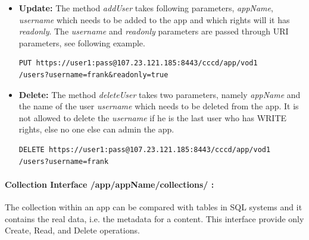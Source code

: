 \begin{itemize}
\item \textbf{Update:} The method \textit{addUser} takes following parameters, \textit{appName}, \textit{username} which needs to be added to the app and which rights will it has \textit{readonly}. The \textit{username} and \textit{readonly} parameters are passed through \ac{URI} parameters, see following example.

\begin{code}
\begin{verbatim}
PUT https://user1:pass@107.23.121.185:8443/cccd/app/vod1
/users?username=frank&readonly=true
\end{verbatim}
\end{code}

\item \textbf{Delete:} The method \textit{deleteUser} takes two parameters, namely \textit{appName} and the name of the user \textit{username} which needs to be deleted from the app. It is not allowed to delete the \textit{username} if he is the last user who has WRITE rights, else no one else can admin the app.

\begin{code}
\begin{verbatim}
DELETE https://user1:pass@107.23.121.185:8443/cccd/app/vod1
/users?username=frank
\end{verbatim}
\end{code}

\end{itemize}

\paragraph{Collection Interface /app/{appName}/collections/ :} The collection within an app can be compared with tables in SQL systems and it contains the real data, i.e. the metadata for a content. This interface provide only Create, Read, and Delete operations. 


